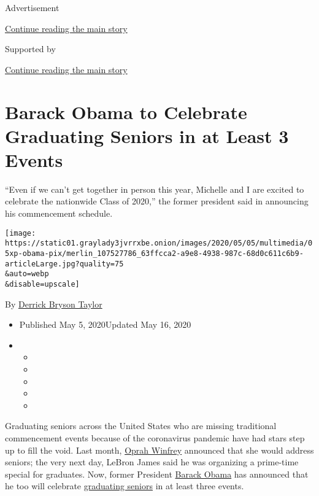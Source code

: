 Advertisement

\protect\hyperlink{after-top}{Continue reading the main story}

Supported by

\protect\hyperlink{after-sponsor}{Continue reading the main story}

\hypertarget{barack-obama-to-celebrate-graduating-seniors-in-at-least-3-events}{%
\section{Barack Obama to Celebrate Graduating Seniors in at Least 3
Events}\label{barack-obama-to-celebrate-graduating-seniors-in-at-least-3-events}}

``Even if we can't get together in person this year, Michelle and I are
excited to celebrate the nationwide Class of 2020,'' the former
president said in announcing his commencement schedule.

\texttt{[image: https://static01.graylady3jvrrxbe.onion/images/2020/05/05/multimedia/05xp-obama-pix/merlin\_107527786\_63ffcca2-a9e8-4938-987c-68d0c611c6b9-articleLarge.jpg?quality=75\\\&auto=webp\\\&disable=upscale]}

By
\href{https://www.nytimes3xbfgragh.onion/by/derrick-bryson-taylor}{Derrick
Bryson Taylor}

\begin{itemize}
\item
  Published May 5, 2020Updated May 16, 2020
\item
  \begin{itemize}
  \item
  \item
  \item
  \item
  \item
  \end{itemize}
\end{itemize}

Graduating seniors across the United States who are missing traditional
commencement events because of the coronavirus pandemic have had stars
step up to fill the void. Last month,
\href{https://www.nytimes3xbfgragh.onion/2020/05/15/us/oprah-winfrey-2020-commencement-speech.html}{Oprah
Winfrey} announced that she would address seniors; the very next day,
LeBron James said he was organizing a prime-time special for graduates.
Now, former President
\href{https://www.nytimes3xbfgragh.onion/2020/05/16/us/barack-obama-2020-commencement-graduation-speech.html}{Barack
Obama} has announced that he too will celebrate
\href{https://www.nytimes3xbfgragh.onion/2020/05/16/us/barack-obama-2020-commencement-graduation-speech.html}{graduating
seniors} in at least three events.

